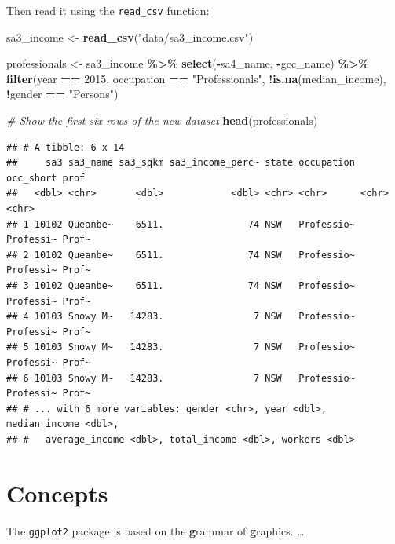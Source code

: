 \documentclass[
]{book}
\newenvironment{Shaded}{\begin{snugshade}}{\end{snugshade}}
\newcommand{\CommentTok}[1]{\textcolor[rgb]{0.56,0.35,0.01}{\textit{#1}}}
\newcommand{\DecValTok}[1]{\textcolor[rgb]{0.00,0.00,0.81}{#1}}
\newcommand{\KeywordTok}[1]{\textcolor[rgb]{0.13,0.29,0.53}{\textbf{#1}}}
\newcommand{\NormalTok}[1]{#1}
\newcommand{\OperatorTok}[1]{\textcolor[rgb]{0.81,0.36,0.00}{\textbf{#1}}}
\newcommand{\StringTok}[1]{\textcolor[rgb]{0.31,0.60,0.02}{#1}}
\begin{document}
Then read it using the \texttt{read\_csv} function:

\begin{Shaded}
\begin{Highlighting}[]
\NormalTok{sa3\_income \textless{}{-}}\StringTok{ }\KeywordTok{read\_csv}\NormalTok{(}\StringTok{"data/sa3\_income.csv"}\NormalTok{)}

\NormalTok{professionals \textless{}{-}}\StringTok{ }\NormalTok{sa3\_income }\OperatorTok{\%\textgreater{}\%}\StringTok{ }
\StringTok{  }\KeywordTok{select}\NormalTok{(}\OperatorTok{{-}}\NormalTok{sa4\_name, }\OperatorTok{{-}}\NormalTok{gcc\_name) }\OperatorTok{\%\textgreater{}\%}\StringTok{ }
\StringTok{  }\KeywordTok{filter}\NormalTok{(year }\OperatorTok{==}\StringTok{ }\DecValTok{2015}\NormalTok{,}
\NormalTok{         occupation }\OperatorTok{==}\StringTok{ "Professionals"}\NormalTok{,}
         \OperatorTok{!}\KeywordTok{is.na}\NormalTok{(median\_income),}
         \OperatorTok{!}\NormalTok{gender }\OperatorTok{==}\StringTok{ "Persons"}\NormalTok{) }

\CommentTok{\# Show the first six rows of the new dataset}
\KeywordTok{head}\NormalTok{(professionals)}
\end{Highlighting}
\end{Shaded}

\begin{verbatim}
## # A tibble: 6 x 14
##     sa3 sa3_name sa3_sqkm sa3_income_perc~ state occupation occ_short prof 
##   <dbl> <chr>       <dbl>            <dbl> <chr> <chr>      <chr>     <chr>
## 1 10102 Queanbe~    6511.               74 NSW   Professio~ Professi~ Prof~
## 2 10102 Queanbe~    6511.               74 NSW   Professio~ Professi~ Prof~
## 3 10102 Queanbe~    6511.               74 NSW   Professio~ Professi~ Prof~
## 4 10103 Snowy M~   14283.                7 NSW   Professio~ Professi~ Prof~
## 5 10103 Snowy M~   14283.                7 NSW   Professio~ Professi~ Prof~
## 6 10103 Snowy M~   14283.                7 NSW   Professio~ Professi~ Prof~
## # ... with 6 more variables: gender <chr>, year <dbl>, median_income <dbl>,
## #   average_income <dbl>, total_income <dbl>, workers <dbl>
\end{verbatim}

\hypertarget{concepts}{%
\section{Concepts}\label{concepts}}

The \texttt{ggplot2} package is based on the \textbf{g}rammar of \textbf{g}raphics. \ldots{}
\end{document}
